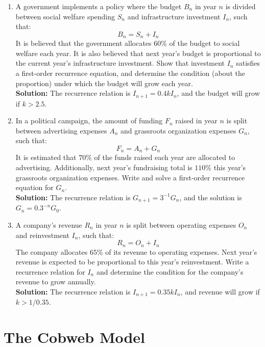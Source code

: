 \documentclass{article}
\begin{document}
\begin{enumerate}[leftmargin = 0.5cm, label = \arabic*., rightmargin = 0.2cm]

    \item A government implements a policy where the budget \( B_n \) in year \(n\) is divided between social welfare spending \(S_n\) and infrastructure investment \(I_n\), such that:
    \[
    B_n = S_n + I_n
    \]
    It is believed that the government allocates $60\%$ of the budget to social welfare each year. It is also believed that next year's budget is proportional to the current year's infrastructure investment. Show that investment \(I_n\) satisfies a first-order recurrence equation, and determine the condition (about the proportion) under which the budget will grow each year. \\
    \textbf{Solution:} The recurrence relation is \( I_{n+1} = 0.4kI_n \), and the budget will grow if $k > 2.5$.

    \item In a political campaign, the amount of funding \( F_n \) raised in year \(n\) is split between advertising expenses \(A_n\) and grassroots organization expenses \(G_n\), such that:
    \[
    F_n = A_n + G_n
    \]
    It is estimated that $70\%$ of the funds raised each year are allocated to advertising. Additionally, next year's fundraising total is $110\%$ this year's grassroots organization expenses. Write and solve a first-order recurrence equation for \(G_n\). \\
    \textbf{Solution:} The recurrence relation is \( G_{n+1} = 3^{-1}G_n \), and the solution is \( G_n = 0.3^{-n}G_0 \).

    \item A company's revenue \(R_n\) in year \(n\) is split between operating expenses \(O_n\) and reinvestment \(I_n\), such that:
    \[
    R_n = O_n + I_n
    \]
    The company allocates $65\%$ of its revenue to operating expenses. Next year's revenue is expected to be proportional to this year's reinvestment. Write a recurrence relation for \(I_n\) and determine the condition for the company’s revenue to grow annually. \\
    \textbf{Solution:} The recurrence relation is \( I_{n+1} = 0.35kI_n \), and revenue will grow if $k > 1/0.35$.

\end{enumerate}

\section{The Cobweb Model}
\end{document}
